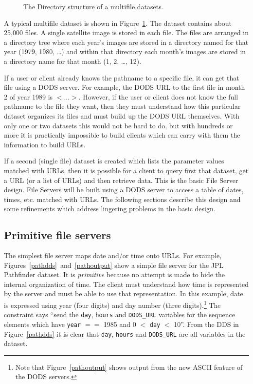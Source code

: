 \documentclass[12pt]{article}
\begin{document}
\begin{figure}
\caption{The Directory structure of a multifile datasets.}
\label{fig:multifile}
\end{figure}

A typical multifile dataset is shown in Figure~\ref{fig:multifile}. The
dataset contains about 25,000 files. A single satellite image is stored in
each file. The files are arranged in a directory tree where each year's
images are stored in a directory named for that year (1979, 1980, \ldots) and
within that directory each month's images are stored in a directory name for
that month (1, 2, \ldots, 12). 

If a user or client already knows the pathname to a specific file, it can get
that file using a DODS server. For example, the DODS URL to the first file in
month 2 of year 1989 is $<$...$>$. However, if the user or client does not
know the full pathname to the file they want, then they must understand how
this particular dataset organizes its files and must build up the DODS URL
themselves. With only one or two datasets this would not be hard to do, but
with hundreds or more it is practically impossible to build clients which can
carry with them the information to build URLs.

If a second (single file) dataset is created which lists the parameter values
matched with URLs, then it is possible for a client to query first that
dataset, get a URL (or a list of URLs) and then retrieve data. This is the
basic File Server design. File Servers will be built using a DODS server to
access a table of dates, times, etc. matched with URLs. The following
sections describe this design and some refinements which address lingering
problems in the basic design.

\subsection{Primitive file servers}

The simplest file server maps date and/or time onto URLs. For example,
Figures~\ref{pathdds}~and~\ref{pathoutput} show a simple file server for the
JPL Pathfinder dataset. It is \emph{primitive} because no attempt is made to
hide the internal organization of time. The client must understand how time
is represented by the server and must be able to use that representation. In
this example, date is expressed using year (four digits) and day number
(three digits).\footnote{Note that Figure~\ref{pathoutput} shows output from
  the new ASCII feature of the DODS servers.} The constraint says ``send the
{\tt day}, {\tt hours} and {\tt DODS\_URL} variables for the sequence
elements which have {\tt year} $==$ 1985 and 0 $<$ {\tt day} $<$ 10''. From
the DDS in Figure~\ref{pathdds} it is clear that {\tt day}, {\tt hours} and
{\tt DODS\_URL} are all variables in the dataset.
\end{document}
